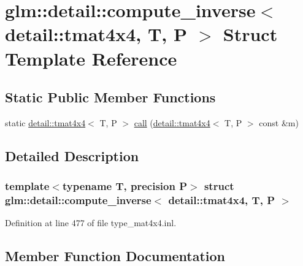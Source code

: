 \hypertarget{structglm_1_1detail_1_1compute__inverse_3_01detail_1_1tmat4x4_00_01_t_00_01_p_01_4}{}\section{glm\+:\+:detail\+:\+:compute\+\_\+inverse$<$ detail\+:\+:tmat4x4, T, P $>$ Struct Template Reference}
\label{structglm_1_1detail_1_1compute__inverse_3_01detail_1_1tmat4x4_00_01_t_00_01_p_01_4}
\subsection*{Static Public Member Functions}
\begin{DoxyCompactItemize}
\item 
static \hyperlink{structglm_1_1detail_1_1tmat4x4}{detail\+::tmat4x4}$<$ T, P $>$ \hyperlink{structglm_1_1detail_1_1compute__inverse_3_01detail_1_1tmat4x4_00_01_t_00_01_p_01_4_a8fd080ed01ae197f2274742a8f1417f3}{call} (\hyperlink{structglm_1_1detail_1_1tmat4x4}{detail\+::tmat4x4}$<$ T, P $>$ const \&m)
\end{DoxyCompactItemize}


\subsection{Detailed Description}
\subsubsection*{template$<$typename T, precision P$>$\newline
struct glm\+::detail\+::compute\+\_\+inverse$<$ detail\+::tmat4x4, T, P $>$}



Definition at line 477 of file type\+\_\+mat4x4.\+inl.



\subsection{Member Function Documentation}
\mbox{\label{structglm_1_1detail_1_1compute__inverse_3_01detail_1_1tmat4x4_00_01_t_00_01_p_01_4_a8fd080ed01ae197f2274742a8f1417f3}} 
